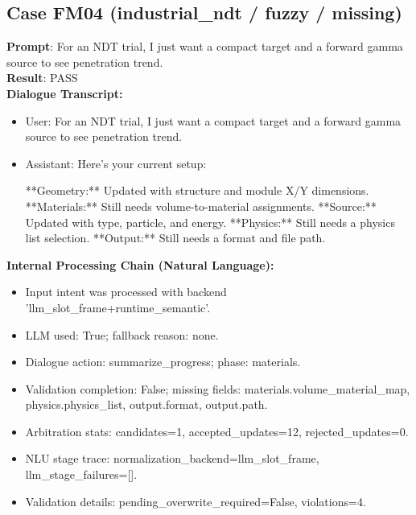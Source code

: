 \documentclass[11pt]{ctexart}
\begin{document}
\subsection{Case FM04 (industrial\_ndt / fuzzy / missing)}
\textbf{Prompt}: For an NDT trial, I just want a compact target and a forward gamma source to see penetration trend.\\
\textbf{Result}: PASS\\
\textbf{Dialogue Transcript:}
\begin{itemize}
\item User: For an NDT trial, I just want a compact target and a forward gamma source to see penetration trend.
\item Assistant: Here's your current setup:

**Geometry:** Updated with structure and module X/Y dimensions.
**Materials:** Still needs volume-to-material assignments.
**Source:** Updated with type, particle, and energy.
**Physics:** Still needs a physics list selection.
**Output:** Still needs a format and file path.
\end{itemize}
\textbf{Internal Processing Chain (Natural Language):}
\begin{itemize}
\item Input intent was processed with backend 'llm\_slot\_frame+runtime\_semantic'.
\item LLM used: True; fallback reason: none.
\item Dialogue action: summarize\_progress; phase: materials.
\item Validation completion: False; missing fields: materials.volume\_material\_map, physics.physics\_list, output.format, output.path.
\item Arbitration stats: candidates=1, accepted\_updates=12, rejected\_updates=0.
\item NLU stage trace: normalization\_backend=llm\_slot\_frame, llm\_stage\_failures=[].
\item Validation details: pending\_overwrite\_required=False, violations=4.
\end{itemize}
\end{document}
